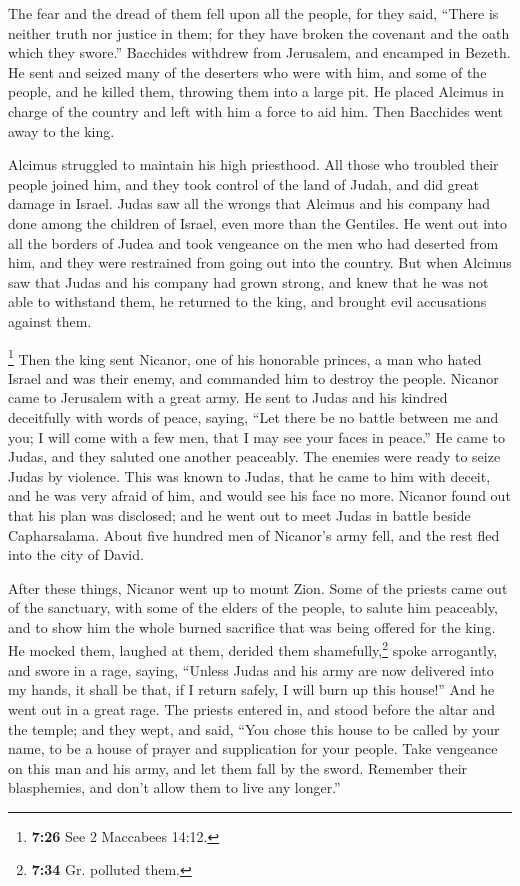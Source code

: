  The fear and the dread of them fell upon all the people,
for they said, ``There is neither truth nor justice in them; for they
have broken the covenant and the oath which they swore.''
 Bacchides withdrew from Jerusalem, and encamped in
Bezeth. He sent and seized many of the deserters who were with him, and
some of the people, and he killed them, throwing them into a large pit.
 He placed Alcimus in charge of the country and left with
him a force to aid him. Then Bacchides went away to the king.

 Alcimus struggled to maintain his high priesthood.
 All those who troubled their people joined him, and they
took control of the land of Judah, and did great damage in Israel.
 Judas saw all the wrongs that Alcimus and his company
had done among the children of Israel, even more than the Gentiles.
 He went out into all the borders of Judea and took
vengeance on the men who had deserted from him, and they were restrained
from going out into the country.  But when Alcimus saw
that Judas and his company had grown strong, and knew that he was not
able to withstand them, he returned to the king, and brought evil
accusations against them.

 \footnote{\textbf{7:26} See 2 Maccabees 14:12.} Then the
king sent Nicanor, one of his honorable princes, a man who hated Israel
and was their enemy, and commanded him to destroy the people.
 Nicanor came to Jerusalem with a great army. He sent to
Judas and his kindred deceitfully with words of peace, saying,
 ``Let there be no battle between me and you; I will come
with a few men, that I may see your faces in peace.''  He
came to Judas, and they saluted one another peaceably. The enemies were
ready to seize Judas by violence.  This was known to
Judas, that he came to him with deceit, and he was very afraid of him,
and would see his face no more.  Nicanor found out that
his plan was disclosed; and he went out to meet Judas in battle beside
Capharsalama.  About five hundred men of Nicanor's army
fell, and the rest fled into the city of David.

 After these things, Nicanor went up to mount Zion. Some
of the priests came out of the sanctuary, with some of the elders of the
people, to salute him peaceably, and to show him the whole burned
sacrifice that was being offered for the king.  He mocked
them, laughed at them, derided them shamefully,\footnote{\textbf{7:34}
  Gr. polluted them.} spoke arrogantly,  and swore in a
rage, saying, ``Unless Judas and his army are now delivered into my
hands, it shall be that, if I return safely, I will burn up this
house!'' And he went out in a great rage.  The priests
entered in, and stood before the altar and the temple; and they wept,
and said,  ``You chose this house to be called by your
name, to be a house of prayer and supplication for your people.
 Take vengeance on this man and his army, and let them
fall by the sword. Remember their blasphemies, and don't allow them to
live any longer.''

